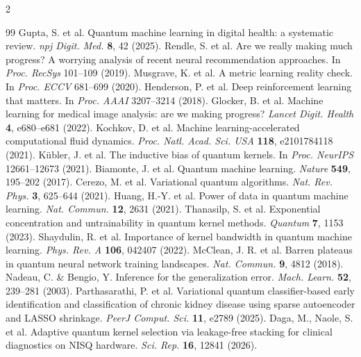 \documentclass[10pt,a4paper,twoside]{article}
\begin{document}
\begin{multicols}{2}
\small
\begin{thebibliography}{99}
\setlength{\itemsep}{1pt}
\setlength{\parskip}{0pt}
 Gupta, S. et al. Quantum machine learning in digital health: a systematic review. \textit{npj Digit. Med.} \textbf{8}, 42 (2025).
 Rendle, S. et al. Are we really making much progress? A worrying analysis of recent neural recommendation approaches. In \textit{Proc. RecSys} 101--109 (2019).
 Musgrave, K. et al. A metric learning reality check. In \textit{Proc. ECCV} 681--699 (2020).
 Henderson, P. et al. Deep reinforcement learning that matters. In \textit{Proc. AAAI} 3207--3214 (2018).
 Glocker, B. et al. Machine learning for medical image analysis: are we making progress? \textit{Lancet Digit. Health} \textbf{4}, e680--e681 (2022).
 Kochkov, D. et al. Machine learning-accelerated computational fluid dynamics. \textit{Proc. Natl. Acad. Sci. USA} \textbf{118}, e2101784118 (2021).
 K{\"u}bler, J. et al. The inductive bias of quantum kernels. In \textit{Proc. NeurIPS} 12661--12673 (2021).
 Biamonte, J. et al. Quantum machine learning. \textit{Nature} \textbf{549}, 195--202 (2017).
 Cerezo, M. et al. Variational quantum algorithms. \textit{Nat. Rev. Phys.} \textbf{3}, 625--644 (2021).
 Huang, H.-Y. et al. Power of data in quantum machine learning. \textit{Nat. Commun.} \textbf{12}, 2631 (2021).
 Thanasilp, S. et al. Exponential concentration and untrainability in quantum kernel methods. \textit{Quantum} \textbf{7}, 1153 (2023).
 Shaydulin, R. et al. Importance of kernel bandwidth in quantum machine learning. \textit{Phys. Rev. A} \textbf{106}, 042407 (2022).
 McClean, J. R. et al. Barren plateaus in quantum neural network training landscapes. \textit{Nat. Commun.} \textbf{9}, 4812 (2018).
 Nadeau, C. \& Bengio, Y. Inference for the generalization error. \textit{Mach. Learn.} \textbf{52}, 239--281 (2003).
 Parthasarathi, P. et al. Variational quantum classifier-based early identification and classification of chronic kidney disease using sparse autoencoder and LASSO shrinkage. \textit{PeerJ Comput. Sci.} \textbf{11}, e2789 (2025).
 Daga, M., Naole, S. et al. Adaptive quantum kernel selection via leakage-free stacking for clinical diagnostics on NISQ hardware. \textit{Sci. Rep.} \textbf{16}, 12841 (2026).

\end{thebibliography}
\end{multicols}
\end{document}
